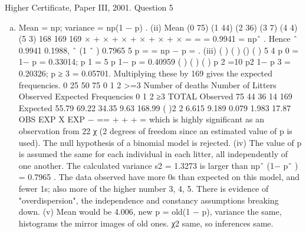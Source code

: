 \documentclass[a4paper,12pt]{article}
\begin{document}
Higher Certificate, Paper III, 2001. Question 5
\begin{enumerate}[(a)]
\item  Mean = np; variance = np(1 − p) .
(ii) Mean (0 75) (1 44) (2 36) (3 7) (4 4) (5 3) 168
169 169
× + × + × + × + × + ×
= =
= 0.9941 = npˆ .
Hence ˆ 0.9941 0.1988, ˆ (1 ˆ ) 0.7965
5
p = = np − p = .
(iii) ( ) ( ) () ( ) 5 4 p 0 = 1− p = 0.33014; p 1 = 5 p 1− p = 0.40959
( ) ( ) ( ) p 2 =10 p2 1− p 3 = 0.20326; p ≥ 3 = 0.05701.
Multiplying these by 169 gives the expected frequencies.
0
25
50
75
0 1 2 >=3
Number of deaths
Number of Litters
Observed
Expected
Frequencies 0 1 2 ≥3 TOTAL
Observed 75 44 36 14 169
Expected 55.79 69.22 34.35 9.63 168.99
( )2
2 6.615 9.189 0.079 1.983 17.87
OBS EXP
X
EXP
−
=\sigma = + + + = which is highly
significant as an observation from 22
χ (2 degrees of freedom since an estimated value
of p is used).
The null hypothesis of a binomial model is rejected.
(iv) The value of p is assumed the same for each individual in each litter, all
independently of one another. The calculated variance s2 = 1.3273 is larger than
npˆ (1− pˆ ) = 0.7965 . The data observed have more 0s than expected on this model,
and fewer 1s; also more of the higher number 3, 4, 5. There is evidence of
"overdispersion", the independence and constancy assumptions breaking down.
(v) Mean would be 4.006, new p = old(1 − p), variance the same, histograms the
mirror images of old ones. χ2 same, so inferences same.

\end{enumerate}
\end{document}
